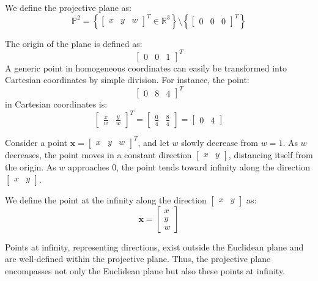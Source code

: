\begin{definition}
    We define the projective plane as:
    \[\mathbb{P}^2=\left\{{\begin{bmatrix} x & y & w \end{bmatrix}}^T \in \mathbb{R}^3\right\}\setminus\left\{{\begin{bmatrix} 0 & 0 & 0 \end{bmatrix}}^T\right\}\]
\end{definition}
\begin{example}
    The origin of the plane is defined as: 
    \[{\begin{bmatrix} 0 & 0 & 1 \end{bmatrix}}^T\]
    A generic point in homogeneous coordinates can easily be transformed into Cartesian coordinates by simple division.
    For instance, the point:
    \[{\begin{bmatrix} 0 & 8 & 4 \end{bmatrix}}^T\]
    in Cartesian coordinates is: 
    \[{\begin{bmatrix} \frac{x}{w} & \frac{y}{w} \end{bmatrix}}^T=\begin{bmatrix} \frac{0}{4} & \frac{8}{4} \end{bmatrix}=\begin{bmatrix} 0 & 4 \end{bmatrix}\]
\end{example}
Consider a point $\mathbf{x}={\begin{bmatrix} x & y & w \end{bmatrix}}^T$, and let $w$ slowly decrease from $w=1$. 
As $w$ decreases, the point moves in a constant direction $\begin{bmatrix} x & y \end{bmatrix}$, distancing itself from the origin.
As $w$ approaches $0$, the point tends toward infinity along the direction $\begin{bmatrix} x & y \end{bmatrix}$. 
\begin{definition}
    We define the point at the infinity along the direction $\begin{bmatrix} x & y \end{bmatrix}$ as: 
    \[\mathbf{x} = \begin{bmatrix} x \\ y \\ w \end{bmatrix}\]
\end{definition}
Points at infinity, representing directions, exist outside the Euclidean plane and are well-defined within the projective plane. 
Thus, the projective plane encompasses not only the Euclidean plane but also these points at infinity.